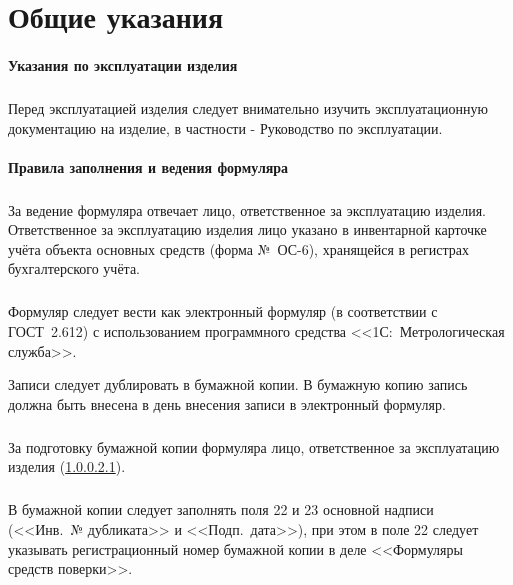 \documentclass[twoside,pointsection]{gost2.105}
\begin{document}
	\maketitle
	\tableofcontents

	\section{Общие указания}
	
	\paragraph{Указания по эксплуатации изделия}
	
	\subparagraph{} Перед эксплуатацией изделия следует внимательно изучить
	эксплуатационную документацию на изделие, в частности - Руководство по эксплуатации.
	
	\paragraph{Правила заполнения и ведения формуляра}

	\subparagraph{}\label{МОЛ} За ведение формуляра отвечает лицо, ответственное за эксплуатацию изделия.
	Ответственное за эксплуатацию изделия лицо указано в
	инвентарной карточке учёта объекта основных средств (форма №~ОС-6),
	хранящейся в регистрах бухгалтерского учёта.
	
	\subparagraph{} Формуляр следует вести как электронный формуляр (в соответствии с ГОСТ~2.612) с использованием программного средства <<1С:~Метрологическая служба>>.
	
	Записи следует дублировать в бумажной копии. В бумажную копию запись должна быть внесена
	в день внесения записи в электронный формуляр.
	
	\subparagraph{} За подготовку бумажной копии формуляра лицо, ответственное за эксплуатацию изделия (\ref{МОЛ}).
	
	\subparagraph{} В бумажной копии следует заполнять поля 22 и 23 основной надписи (<<Инв.~№ дубликата>> и <<Подп.~дата>>), при этом в поле 22 следует указывать регистрационный номер бумажной копии в деле <<Формуляры средств поверки>>.
	
\end{document}

